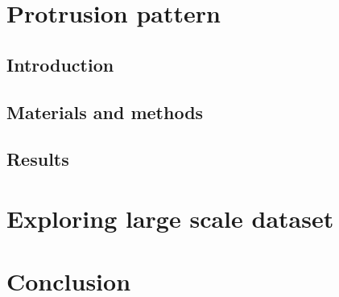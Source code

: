 \section{Protrusion pattern}
\label{sec:protrusion}

\subsection{Introduction}
\label{subsec:introduction_protrusion}

\subsection{Materials and methods}
\label{subsec:materials_protrusion}

\subsection{Results}
\label{subsec:results_protrusion}

\section{Exploring large scale dataset}
\label{sec:exploration}

\section{Conclusion}
\label{sec:conclusion_chapter5}
